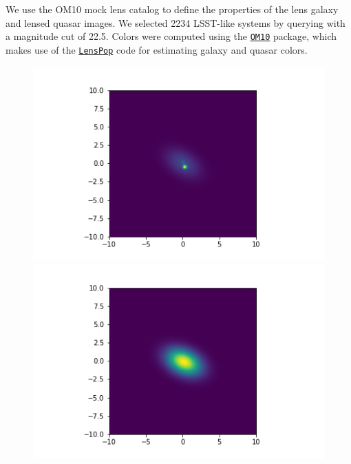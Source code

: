 \documentclass[\docopts]{\docclass}
\begin{document}
We use the OM10 mock lens catalog \citep{OM10} to define the properties
of the lens galaxy and lensed quasar images. We selected 2234 LSST-like
systems by querying with a magnitude cut of 22.5. Colors were computed
using the \href{https://github.com/drphilmarshall/OM10}{\texttt{OM10}} package, which makes use of the \href{https://github.com/tcollett/LensPop}{\texttt{LensPop}}
code \citep{LensPop} for estimating galaxy and quasar colors.

\begin{figure}
    \centering
    \begin{minipage}{0.48\linewidth}
        \centering
        \includegraphics[width=\linewidth]{beforenulldeblend.png}
    \end{minipage}\hfill
    \begin{minipage}{0.48\linewidth}
        \centering
        \includegraphics[width=\linewidth]{afternulldeblend.png}

\end{minipage}
\end{figure}
\end{document}
